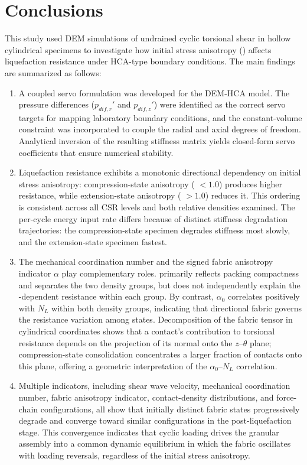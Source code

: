 \section{Conclusions}
\label{sec:conclusions}

This study used DEM simulations of undrained cyclic torsional shear in hollow cylindrical specimens to investigate how initial stress anisotropy (\Kzero{}) affects liquefaction resistance under HCA-type boundary conditions. The main findings are summarized as follows:

\begin{enumerate}
\item A coupled servo formulation was developed for the DEM-HCA model. The pressure differences ($p_{dif,r}'$ and $p_{dif,z}'$) were identified as the correct servo targets for mapping laboratory boundary conditions, and the constant-volume constraint was incorporated to couple the radial and axial degrees of freedom. Analytical inversion of the resulting stiffness matrix yields closed-form servo coefficients that ensure numerical stability.

\item Liquefaction resistance exhibits a monotonic directional dependency on initial stress anisotropy: compression-state anisotropy (\Kzero{} $< 1.0$) produces higher resistance, while extension-state anisotropy (\Kzero{} $> 1.0$) reduces it. This ordering is consistent across all CSR levels and both relative densities examined. The per-cycle energy input rate differs because of distinct stiffness degradation trajectories: the compression-state specimen degrades stiffness most slowly, and the extension-state specimen fastest.

\item The mechanical coordination number \Zm{} and the signed fabric anisotropy indicator $\alpha$ play complementary roles. \Zm{} primarily reflects packing compactness and separates the two density groups, but does not independently explain the \Kzero{}-dependent resistance within each group. By contrast, $\alpha_0$ correlates positively with $N_L$ within both density groups, indicating that directional fabric governs the resistance variation among \Kzero{} states. Decomposition of the fabric tensor in cylindrical coordinates shows that a contact's contribution to torsional resistance depends on the projection of its normal onto the $z$--$\theta$ plane; compression-state consolidation concentrates a larger fraction of contacts onto this plane, offering a geometric interpretation of the $\alpha_0$--$N_L$ correlation.

\item Multiple indicators, including shear wave velocity, mechanical coordination number, fabric anisotropy indicator, contact-density distributions, and force-chain configurations, all show that initially distinct fabric states progressively degrade and converge toward similar configurations in the post-liquefaction stage. This convergence indicates that cyclic loading drives the granular assembly into a common dynamic equilibrium in which the fabric oscillates with loading reversals, regardless of the initial stress anisotropy.

\end{enumerate}
